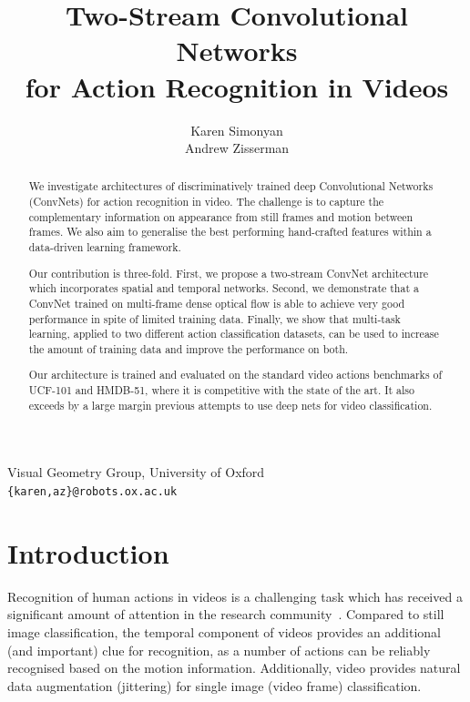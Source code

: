\documentclass{article} %
\title{Two-Stream Convolutional Networks \\ for Action Recognition in Videos}
\author{
Karen Simonyan \\
\And
Andrew Zisserman
}
\begin{document}
\maketitle

\vspace{-3.5em}
\begin{center}
Visual Geometry Group, University of Oxford\\
\texttt{\{karen,az\}@robots.ox.ac.uk}  
\end{center}
\vspace{1em}

\begin{abstract}
We investigate architectures of discriminatively trained deep
Convolutional Networks (ConvNets) for action recognition in video. The
challenge is to capture the complementary information on appearance
from still frames and motion between frames. 
We also aim to generalise the best performing hand-crafted features within a data-driven learning framework.

Our contribution is three-fold. First, we propose a two-stream
ConvNet architecture which incorporates spatial and temporal networks.
Second, we demonstrate that a ConvNet trained on multi-frame dense
optical flow is able to achieve very good performance in spite of
limited training data.  Finally, we show that multi-task learning,
applied to two different action classification datasets, can be used
to increase the amount of training data and improve the
performance on both.

Our architecture is trained and evaluated on the standard video actions
benchmarks of UCF-101 and HMDB-51, where it is competitive with the state of the art.
It also exceeds by a large margin previous attempts to use deep nets for video classification.
\end{abstract}

\section{Introduction}
\label{sec:intro}
Recognition of human actions in videos is a challenging task which has
received a significant amount of attention in the research
community~\cite{Laptev08,Jhuang07,Wang13b,Karpathy14}.  Compared to
still image classification, 
the temporal component of videos
provides an additional (and important) clue for recognition, as a
number of actions can be reliably recognised based on the motion
information. Additionally, video provides natural data augmentation
(jittering) for single image (video frame) classification.
\end{document}

